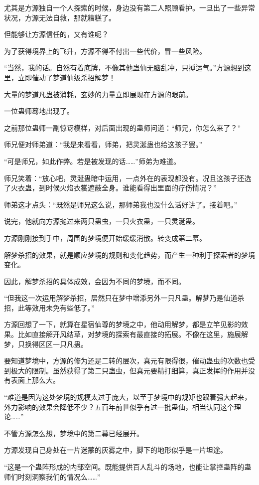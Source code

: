 \begin{this_body}
尤其是方源独自一个人探索的时候，身边没有第二人照顾看护。一旦出了一些异常状况，方源无法自救，那就糟糕了。

但能够让方源信任的，又有谁呢？

为了获得境界上的飞升，方源不得不付出一些代价，冒一些风险。

“当然，我的话。自然有着底牌，不像其他蛊仙无脑乱冲，只搏运气。”方源想到这里，立即催动了梦道仙级杀招解梦！

大量的梦道凡蛊被消耗，玄妙的力量立即展现在方源的眼前。

一位蛊师蓦地出现了。

之前那位蛊师一副惊讶模样，对后面出现的蛊师问道：“师兄，你怎么来了？”

师兄便对师弟道：“我是来看看，师弟，把灵涎蛊也给这孩子罢。”

“可是师兄，如此作弊。若是被发现的话……”师弟为难道。

师兄笑着：“放心吧，灵涎蛊暗中运用，一点外在的表现都没有。况且这孩子还选了火衣蛊，到时候火焰衣裳遮蔽全身。谁能看得出里面的疗伤情况？”

师弟这才点头：“既然是师兄这么说，那师弟我也没什么话好讲了。接着吧。”

说完，他就向方源抛过来两只蛊虫，一只火衣蛊，一只灵涎蛊。

方源刚刚接到手中，周围的梦境便开始缓缓消散。转变成第二幕。

解梦杀招的效果，就是顺应梦境的规则和变化趋势，而产生一种利于探索者的梦境变化。

因此，解梦杀招的具体成效，会因为不同的梦境，而不同。

“但我这一次运用解梦杀招，居然只在梦中增添另外一只凡蛊。解梦乃是仙道杀招，此等效用未免有些低了。”

方源回想了一下，就算在星宿仙尊的梦境之中，他动用解梦，都是立竿见影的效果。比如直接解开风结草，对梦境的探索有最直接的拓展。不像在这里，施展解梦，只换得区区一只凡蛊。

要知道梦境中，方源的修为还是二转的层次，真元有限得很，催动蛊虫的次数也受到极大的限制。虽然获得了第二只蛊虫，但真元要精打细算，真正发挥的作用并没有表面上那么大。

“难道是因为这处梦境的规模太过于庞大，以至于梦境中的规矩也跟着强大起来，外力影响的效果会降低不少？五百年前世似乎有过一批蛊仙，相当认同这个理论……”

不管方源怎么想，梦境中的第二幕已经展开。

方源发现自己身处在一片迷蒙的灰雾之中，脚下的地形似乎是一片坦途。

“这是一个蛊阵形成的内部空间。既能提供百人乱斗的场地，也能让掌控蛊阵的蛊师们时刻洞察我们的情况么……”


\end{this_body}
